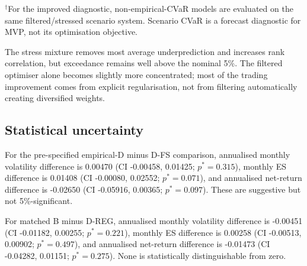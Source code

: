 \documentclass[11pt,a4paper]{article}
\begin{document}
\begin{table}[H]
\centering
\caption{Post-2021 tail calibration and concentration}
\label{tab:calibration}
\vspace{0.3em}
\begin{minipage}{0.94\textwidth}\footnotesize
$^\dagger$For the improved diagnostic, non-empirical-CVaR models are evaluated on the same filtered/stressed scenario system. Scenario CVaR is a forecast diagnostic for MVP, not its optimisation objective.
\end{minipage}
\end{table}

The stress mixture removes most average underprediction and increases rank correlation, but exceedance remains well above the nominal 5\%. The filtered optimiser alone becomes slightly more concentrated; most of the trading improvement comes from explicit regularisation, not from filtering automatically creating diversified weights.

\subsection{Statistical uncertainty}

For the pre-specified empirical-D minus D-FS comparison, annualised monthly volatility difference is 0.00470 (CI -0.00458, 0.01425; $p^*=0.315$), monthly ES difference is 0.01408 (CI -0.00080, 0.02552; $p^*=0.071$), and annualised net-return difference is -0.02650 (CI -0.05916, 0.00365; $p^*=0.097$). These are suggestive but not 5\%-significant.

For matched B minus D-REG, annualised monthly volatility difference is -0.00451 (CI -0.01182, 0.00255; $p^*=0.221$), monthly ES difference is 0.00258 (CI -0.00513, 0.00902; $p^*=0.497$), and annualised net-return difference is -0.01473 (CI -0.04282, 0.01151; $p^*=0.275$). None is statistically distinguishable from zero.
\end{document}
